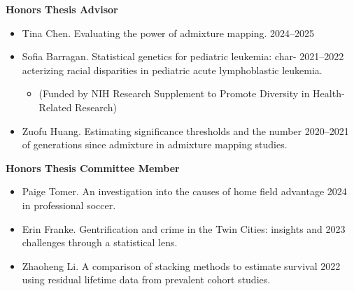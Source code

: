 \documentclass[margin]{res}
\begin{document}
\begin{resume}
\textbf{Honors Thesis Advisor}
\begin{itemize}

\item Tina Chen. Evaluating the power of admixture mapping. \hfill 2024--2025

\item Sofia Barragan. Statistical genetics for pediatric leukemia: char- \hfill 2021--2022 \\ acterizing racial disparities in pediatric acute lymphoblastic leukemia.
	\begin{itemize}[leftmargin=-0in]  \vspace{-0.2cm}
	\item[]\begin{footnotesize}(Funded by NIH Research Supplement to Promote Diversity in Health-Related Research) \end{footnotesize}
	\end{itemize}

\item Zuofu Huang. Estimating significance thresholds and the number  \hfill 2020--2021 \\of generations since admixture in admixture mapping studies. %

\end{itemize}

\textbf{Honors Thesis Committee Member}
\begin{itemize}

\item Paige Tomer.  An investigation into the causes of home field advantage \hfill 2024 \\ in professional soccer. 

\item Erin Franke. Gentrification and crime in the Twin Cities: insights and \hfill 2023 \\ challenges through a statistical lens. 

\item Zhaoheng Li. A comparison of stacking methods to estimate survival  \hfill 2022 \\ using residual lifetime data from prevalent cohort studies.  \\

\end{itemize}


\end{resume}
\end{document}
